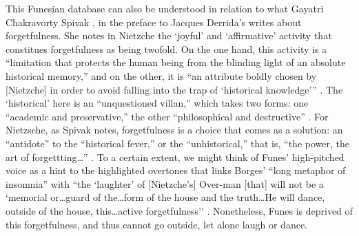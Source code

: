 This Funesian database can also be understood in relation to what Gayatri Chakravorty Spivak \parencite{Der76:Of}, in the preface to Jacques Derrida's  writes about forgetfulness. She notes in Nietzche the `joyful' and `affirmative' activity that constitues forgetfulness as being twofold. On the one hand, this activity is a ``limitation that protects the human being from the blinding light of an absolute historical memory,'' and on the other, it is ``an attribute boldly chosen by [Nietzche] in order to avoid falling into the trap of `historical knowledge''' \parencite[xxxi]{Der76:Of}. The `historical' here is an ``unquestioned villan,'' which takes two forms: one ``academic and preservative,'' the other ``philosophical and destructive'' \parencite[xxxi]{Der76:Of}. For Nietzsche, as Spivak notes, forgetfulness is a choice that comes as a solution: an ``antidote'' to the ``historical fever,'' or the ``unhistorical,'' that is, ``the power, the art of forgettting\dots'' \parencite[xxxi]{Der76:Of}. To a certain extent, we might think of Funes' high-pitched voice as a hint to the highlighted overtones that links Borges' ``long metaphor of insomnia'' with ``the `laughter' of [Nietzche's] Over-man [that] will not be a `memorial or\dots guard of the\dots form of the house and the truth\dots He will dance, outside of the house, this\dots active forgetfulness'' \parencite[xxxii]{Der76:Of}. Nonetheless, Funes is deprived of this forgetfulness, and thus cannot go outside, let alone laugh or dance.



